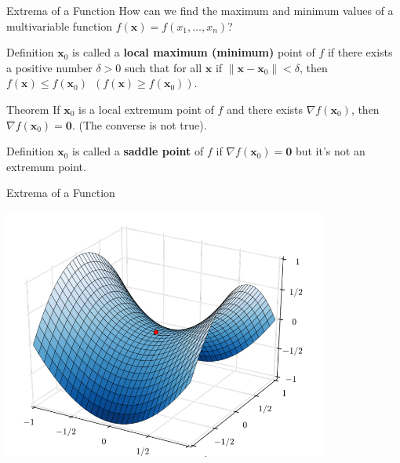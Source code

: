 \documentclass{beamer}
\newcommand{\vx}{\mathbf{x}}
\begin{document}
\begin{frame}{Extrema of a Function}
How can we find the maximum and minimum values of a multivariable function $f(\vx)=f(x_1,\dots,x_n)$?\pause

\begin{block}{Definition}
    $\vx_0$ is called a \textbf{local maximum (minimum)} point of $f$ if there exists a positive number $\delta>0$ such that for all $\vx$ if $\|\vx-\vx_0\|< \delta$, then  $f(\vx) \leq f(\vx_0)$ $\, (f(\vx) \geq f(\vx_0))$.
\end{block}\pause

\begin{block}{Theorem}
    If $\vx_0$ is a local extremum point of $f$ and there exists $\nabla f(\vx_0)$, then $\nabla f(\vx_0) = \textbf{0}$. (The converse is not true).
\end{block}\pause


\begin{block}{Definition}
    $\vx_0$ is called a \textbf{saddle point} of $f$ if $\nabla f(\vx_0) = \textbf{0}$ but it's not an extremum point.
\end{block}

\end{frame}


\begin{frame}{Extrema of a Function}
      \begin{center}

    \includegraphics[width=0.8\textwidth, height=\textheight, keepaspectratio]{saddle.png}
  \end{center}
\end{frame}
\end{document}
